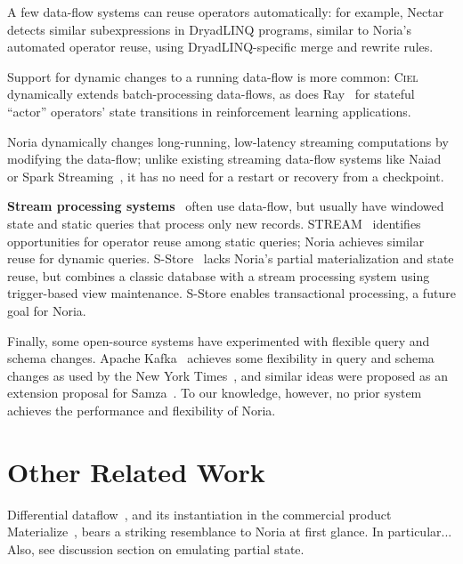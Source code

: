 A few data-flow systems can reuse operators automatically: for example,
Nectar~\cite{nectar} detects similar subexpressions in DryadLINQ programs,
similar to Noria's automated operator reuse, using DryadLINQ-specific
merge and rewrite rules.

Support for dynamic changes to a running data-flow is more common:
\textsc{Ciel}~\cite{ciel} dynamically extends batch-processing data-flows,
as does Ray~\cite{ray} for stateful ``actor'' operators' state transitions
in reinforcement learning applications.

Noria dynamically changes long-running, low-latency streaming computations by
modifying the data-flow; unlike existing streaming data-flow systems like
Naiad~\cite{naiad} or Spark Streaming~\cite{spark-streaming}, it has no
need for a restart or recovery from a checkpoint.

\textbf{Stream processing systems}~\cite{storm, heron, flink, millwheel,
spark-streaming} often use data-flow, but usually have windowed state and
static queries that process only new records. STREAM~\cite{stanford-stream}
identifies opportunities for operator reuse among static queries; Noria achieves
similar reuse for dynamic queries. S-Store~\cite{s-store} lacks Noria's partial
materialization and state reuse, but combines a classic database with a stream
processing system using trigger-based view maintenance. S-Store enables
transactional processing, a future goal for Noria.

Finally, some open-source systems have experimented with flexible query and
schema changes.
%
Apache Kafka~\cite{kafka} achieves some flexibility in query and schema
changes as used by the New York Times~\cite{nyt-kafka}, and
%
similar ideas were proposed as an extension proposal for
Samza~\cite{samza-blogpost}.
%
To our knowledge, however, no prior system achieves the performance and
flexibility of Noria.
%

\section{Other Related Work}

%

%
\begin{comment}
Shared Arrangements:
http://www.vldb.org/pvldb/vol13/p1793-mcsherry.pdf
\end{comment}

Differential dataflow~\cite{naiad,differential-dataflow}, and its instantiation
in the commercial product Materialize~\cite{materialize}, bears a striking
resemblance to Noria at first glance. In particular... Also, see discussion
section on emulating partial state.
